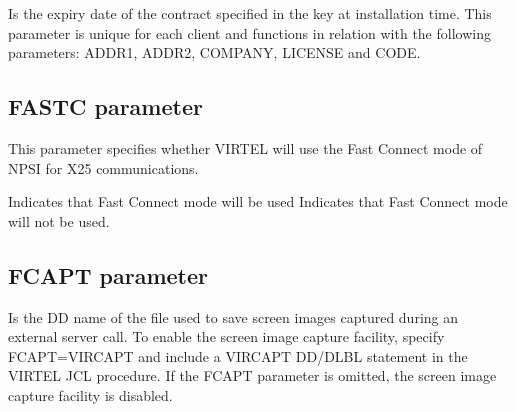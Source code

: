 \documentclass[letterpaper,10pt,english]{sphinxmanual}
\begin{document}
\sphinxAtStartPar
{} \sphinxhyphen{} Is the expiry date of the contract specified in the key at installation time. This parameter is unique for each client and functions in relation with the following parameters: ADDR1, ADDR2, COMPANY, LICENSE and CODE.

\ignorespaces 

\subsection{FASTC parameter}
\label{\detokenize{Installation_Guide:fastc-parameter}}\label{\detokenize{Installation_Guide:index-64}}
\begin{sphinxVerbatim}[commandchars=\\\{\}]
 
\end{sphinxVerbatim}

\sphinxAtStartPar
This parameter specifies whether VIRTEL will use the Fast Connect mode of NPSI for X25 communications.

\sphinxAtStartPar
{} \sphinxhyphen{} Indicates that Fast Connect mode will be used
 \sphinxhyphen{} Indicates that Fast Connect mode will not be used.

\ignorespaces 

\subsection{FCAPT parameter}
\label{\detokenize{Installation_Guide:fcapt-parameter}}\label{\detokenize{Installation_Guide:index-65}}
\begin{sphinxVerbatim}[commandchars=\\\{\}]
  
\end{sphinxVerbatim}

\sphinxAtStartPar
{} \sphinxhyphen{} Is the DD name of the file used to save screen images captured during an external server call. To enable the screen image capture facility, specify FCAPT=VIRCAPT and include a VIRCAPT DD/DLBL statement in the VIRTEL JCL procedure. If the FCAPT parameter is omitted, the screen image capture facility is disabled.
\end{document}
